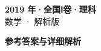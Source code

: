 \documentclass[zihao=-4, a4paper]{ctexart}
\begin{document}
\begin{center}
  {\Large\bfseries 2019 年·全国Ⅰ卷·理科}\\[4pt]
  {\large 数学 · 解析版}
\end{center}
\medskip
{}

\clearpage
{}
\begin{center}{\Large\bfseries 参考答案与详细解析}\end{center}
\medskip

\end{document}
